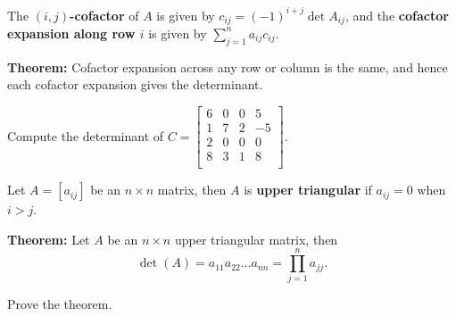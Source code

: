 \documentclass[12pt,letterpaper]{article}
\begin{document}
\begin{enumerate}
\vfill

\begin{defn} The {\bf $(i,j)$-cofactor} of $A$ is given by $c_{ij} =(-1)^{i+j} \operatorname{det} A_{ij}$, and the {\bf cofactor expansion along row $i$} is given by $\sum_{j=1}^{n}a_{ij} c_{ij}$.
\end{defn}



{\bf Theorem:} Cofactor expansion across any row or column is the same, and hence each cofactor expansion gives the determinant.

\newpage

\Problem Compute the determinant of 
$C=\begin{bmatrix}
6 & 0 & 0 & 5\\
1 & 7 & 2 & -5\\
2 & 0 & 0 & 0\\
8 & 3 & 1 & 8\\
\end{bmatrix}$.

\vfill

\begin{defn} Let $A=[a_{ij}]$ be an $n\times n$ matrix, then $A$ is {\bf upper triangular} if $a_{ij}=0$ when $i>j$.
\end{defn}

{\bf Theorem:} Let $A$ be an $n\times n$ upper triangular matrix, then $$\operatorname{det}(A)= a_{11}a_{22}\dots a_{nn} = \prod_{j=1}^n a_{jj}.$$

\Problem Prove the theorem.

\vfill
\vfill

\end{enumerate}


\newpage
{}%
\lhead{}
\rhead{}
\thispagestyle{fancy}
\end{document}
